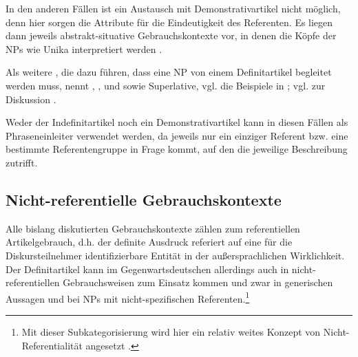 \begin{exe}
	\ex \label{ex:bill}  
\end{exe}

In den anderen Fällen ist ein Austausch mit Demonstrativartikel nicht möglich, denn hier sorgen die Attribute für die Eindeutigkeit des Referenten. Es liegen dann jeweils abstrakt-situative Gebrauchskontexte vor, in denen die Köpfe der NPs wie Unika interpretiert werden  \parencite[38]{Himmelmann1997}. 

Als weitere , die dazu führen, dass eine NP von einem Definitartikel begleitet werden muss, nennt  \textcite[148,228ff.]{Hawkins1978} , ,  und  sowie Superlative, vgl. die Beispiele in ; vgl. zur Diskussion \textcite[9]{Lyons1999}.

 \begin{exe}
	\ex \label{ex:mod}   
	\begin{xlist}
		\ex \label{ex:same} 
		\ex \label{ex:only}    
		\ex \label{ex:next}  
		\ex \label{ex:first}   
		\ex \label{ex:super} 
		\end{xlist}
\end{exe}

Weder der Indefinitartikel noch ein Demonstrativartikel kann in diesen Fällen als Phraseneinleiter verwendet werden, da jeweils nur ein einziger Referent bzw. eine bestimmte Referentengruppe in Frage kommt, auf den die jeweilige Beschreibung zutrifft.  

\subsection{Nicht-referentielle Gebrauchskontexte}\label{sec:nicht-referentiell}

Alle bislang diskutierten Gebrauchskontexte zählen zum referentiellen Artikelgebrauch, d.h. der definite Ausdruck referiert auf eine für die Diskursteilnehmer identifizierbare Entität in der außersprachlichen Wirklichkeit.
Der Definitartikel kann im Gegenwartsdeutschen allerdings auch in nicht-referentiellen Gebrauchsweisen zum Einsatz kommen und zwar in generischen Aussagen und bei NPs mit nicht-spezifischen Referenten.\footnote{Mit dieser Subkategorisierung wird hier ein relativ weites Konzept von Nicht-Referentialität  angesetzt \parencite[zur Abgrenzungsdiskussion von Definitheit, Spezifizität und Referentialität vgl. u.a.][]{Bisle-Muller1991,Lyons1999,Studler2011,vonHeusinger2011}.} 

